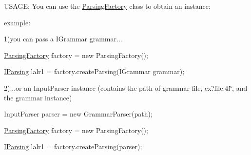 U\-S\-A\-G\-E\-: You can use the \hyperlink{classcontext_free_1_1parser_1_1_parsing_factory}{Parsing\-Factory} class to obtain an instance\-:\par
 example\-:\par
 1)you can pass a I\-Grammar grammar...\par
 \hyperlink{classcontext_free_1_1parser_1_1_parsing_factory}{Parsing\-Factory} factory = new Parsing\-Factory();\par
 \hyperlink{interfacecontext_free_1_1parser_1_1_i_parsing}{I\-Parsing} lalr1 = factory.\-create\-Parsing(\-I\-Grammar grammar);\par
 \par
 2)...or an Input\-Parser instance (contains the path of grammar file, ex.\char`\"{}file.\-4l\char`\"{}, and the grammar instance)\par


Input\-Parser parser = new Grammar\-Parser(path);\par
 \hyperlink{classcontext_free_1_1parser_1_1_parsing_factory}{Parsing\-Factory} factory = new Parsing\-Factory();\par
 \hyperlink{interfacecontext_free_1_1parser_1_1_i_parsing}{I\-Parsing} lalr1 = factory.\-create\-Parsing(parser);\par
 